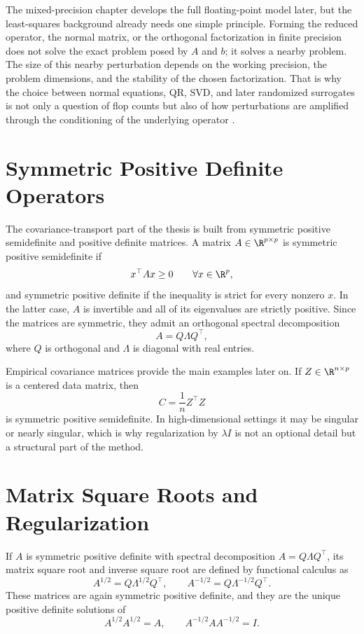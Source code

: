 The mixed-precision chapter develops the full floating-point model later, but the
least-squares background already needs one simple principle. Forming the reduced
operator, the normal matrix, or the orthogonal factorization in finite precision does
not solve the exact problem posed by \(A\) and \(b\); it solves a nearby problem.
The size of this nearby perturbation depends on the working precision, the problem
dimensions, and the stability of the chosen factorization. That is why the choice
between normal equations, QR, SVD, and later randomized surrogates is not only a
question of flop counts but also of how perturbations are amplified through the
conditioning of the underlying operator \cite{higham2022mixed}.

\section{Symmetric Positive Definite Operators}

The covariance-transport part of the thesis is built from symmetric positive
semidefinite and positive definite matrices. A matrix \(A \in \R^{p \times p}\) is
symmetric positive semidefinite if
\[
	x^\top A x \ge 0 \qquad \forall x \in \R^p,
\]
and symmetric positive definite if the inequality is strict for every nonzero
\(x\). In the latter case, \(A\) is invertible and all of its eigenvalues are strictly
positive. Since the matrices are symmetric, they admit an orthogonal spectral
decomposition
\[
	A = Q \Lambda Q^\top,
\]
where \(Q\) is orthogonal and \(\Lambda\) is diagonal with real entries.

Empirical covariance matrices provide the main examples later on. If
\(Z \in \R^{n \times p}\) is a centered data matrix, then
\[
	C = \frac{1}{n} Z^\top Z
\]
is symmetric positive semidefinite. In high-dimensional settings it may be
singular or nearly singular, which is why regularization by \(\lambda I\) is not an
optional detail but a structural part of the method.

\section{Matrix Square Roots and Regularization}

If \(A\) is symmetric positive definite with spectral decomposition
\(A = Q \Lambda Q^\top\), its matrix square root and inverse square root are defined
by functional calculus as
\[
	A^{1/2} = Q \Lambda^{1/2} Q^\top,
	\qquad
	A^{-1/2} = Q \Lambda^{-1/2} Q^\top.
\]
These matrices are again symmetric positive definite, and they are the unique
positive definite solutions of
\[
	A^{1/2}A^{1/2} = A,
	\qquad
	A^{-1/2} A A^{-1/2} = I.
\]

